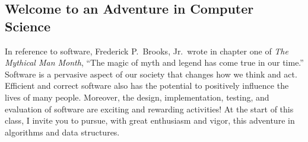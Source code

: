 \documentclass[11pt]{article}
\begin{document}
\subsection*{Welcome to an Adventure in Computer Science}

In reference to software, Frederick P.\ Brooks, Jr.\ wrote in chapter one of
{\em The Mythical Man Month}, ``The magic of myth and legend has come true in
our time.'' Software is a pervasive aspect of our society that changes how we
think and act. Efficient and correct software also has the potential to
positively influence the lives of many people. Moreover, the design,
implementation, testing, and evaluation of software are exciting and rewarding
activities! At the start of this class, I invite you to pursue, with great
enthusiasm and vigor, this adventure in algorithms and data structures.
\end{document}
